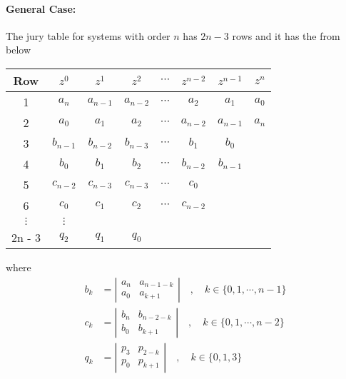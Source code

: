 \documentclass[twoside]{article}
\begin{document}
\paragraph{General Case:} 
%
The jury table for systems with order $n$ has $2n - 3$
rows and it has the from below
%
\begin{center}
  \begin{tabular}{ | c || c c c c c c c|}
    \hline
    Row & $z^0$ & $z^1$ & $z^2$ & $\cdots$ & $z^{n-2}$ & $z^{n-1}$ & $z^n$ \\ \hline \hline
    1 & $a_n$ & $a_{n-1}$ & $a_{n-2}$ & $\cdots$ & $a_2$ & $a_1$ & $a_0$ \\ \hline
    2 & $a_0$ & $a_1$ & $a_2$ & $\cdots$ & $a_{n-2}$ & $a_{n-1}$ & $a_{n}$ \\ \hline
    3 & $b_{n-1}$ & $b_{n-2}$ & $b_{n-3}$ & $\cdots$ & $b_1$ & $b_0$ &
                                                                        \\ \hline
    4 & $b_0$ & $b_1$ & $b_2$ & $\cdots$ & $b_{n-2}$ & $b_{n-1}$ & \\
    \hline
    5 & $c_{n-2}$ & $c_{n-3}$ & $c_{n-3}$ & $\cdots$ & $c_0$ &  &  \\ \hline
    6 & $c_0$ & $c_1$ & $c_2$ & $\cdots$ & $c_{n-2}$ &  & \\ \hline
$\vdots$ & $\vdots$ & & & & &  & \\ \hline
    2n - 3 & $q_2$ & $q_1$ & $q_0$ & & & &  \\ \hline
  \end{tabular}
\end{center}
%
where
%
\begin{align*}
  b_{k} &= \left| \begin{array}{cc} a_n & a_{n-1-k} \\ a_0 &
       a_{k+1} \end{array} \right| \quad , \quad  k \in \lbrace 0,1,
                                                            \cdots,
                                                            n-1
                                                            \rbrace
\\
  c_{k} &= \left| \begin{array}{cc} b_n & b_{n-2-k} \\ b_0 &
       b_{k+1} \end{array} \right| \quad , \quad  k \in \lbrace 0,1,
                                                            \cdots,
                                                            n-2
                                                            \rbrace
\\
  q_{k} &= \left| \begin{array}{cc} p_3 & p_{2-k} \\ p_0 &
       p_{k+1} \end{array} \right| \quad , \quad  k \in \lbrace 0,1,3 \rbrace
\end{align*}
\end{document}
